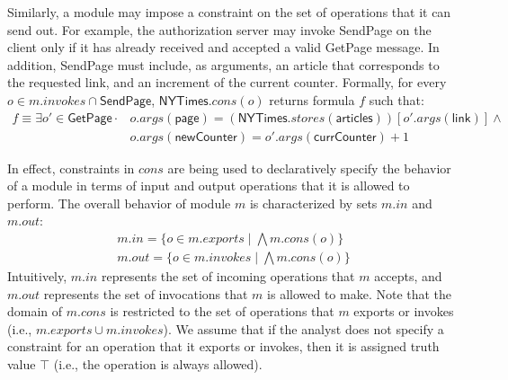Similarly, a module may impose a constraint on the set of operations
that it can send out. For example, the authorization server may invoke
\textsf{SendPage} on the client only if it has already received and
accepted a valid \textsf{GetPage} message. In addition,
\textsf{SendPage} must include, as arguments, an article that
corresponds to the requested link, and an increment of the current
counter. Formally, for every $o \in m.invokes \cap \textsf{SendPage}$,
$\textsf{NYTimes}.cons(o)$ returns formula $f$ such that:
\begin{align*}
f \equiv \exists o' \in \textsf{GetPage} \cdot & o.args(\textsf{page}) =
(\textsf{NYTimes}.stores(\textsf{articles}))[o'.args(\textsf{link})]
\land \\
& o.args(\textsf{newCounter}) = o'.args(\textsf{currCounter}) + 1
\end{align*}

In effect, constraints in $cons$ are being used to
declaratively specify the behavior of a module in terms of input and
output operations that it is allowed to perform. The overall behavior
of module $m$ is characterized by sets $m.in$ and $m.out$:
\begin{align*}
m.in = \{ o \in m.exports \;|\; \bigwedge m.cons(o) \} \\
m.out = \{ o \in m.invokes \;|\; \bigwedge m.cons(o) \}
\end{align*}
Intuitively, $m.in$ represents the set of incoming operations that $m$
accepts, and $m.out$ represents the set of invocations that $m$ is
allowed to make. Note that the domain of $m.cons$ is restricted to
the set of operations that $m$ exports or invokes (i.e., $m.exports
\cup m.invokes$). We assume that if the analyst does not specify a
constraint for an operation that it exports or invokes,
then it is assigned truth value $\top$ (i.e., the operation is always
allowed).
